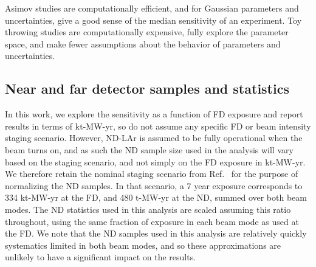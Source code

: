 Asimov studies are computationally efficient, and for Gaussian parameters and uncertainties, give a good sense of the median sensitivity of an experiment. Toy throwing studies are computationally expensive, fully explore the parameter space, and make fewer assumptions about the behavior of parameters and uncertainties.


\subsection{Near and far detector samples and statistics}
In this work, we explore the sensitivity as a function of FD exposure and report results in terms of kt-MW-yr, so do not assume any specific FD or beam intensity staging scenario. However, ND-LAr is assumed to be fully operational when the beam turns on, and as such the ND sample size used in the analysis will vary based on the staging scenario, and not simply on the FD exposure in kt-MW-yr. We therefore retain the nominal staging scenario from Ref.~\cite{Abi:2020qib} for the purpose of normalizing the ND samples. In that scenario, a 7 year exposure corresponds to 334 kt-MW-yr at the FD, and 480 t-MW-yr at the ND, summed over both beam modes. The ND statistics used in this analysis are scaled assuming this ratio throughout, using the same fraction of exposure in each beam mode as used at the FD. We note that the ND samples used in this analysis are relatively quickly systematics limited in both beam modes, and so these approximations are unlikely to have a significant impact on the results.

